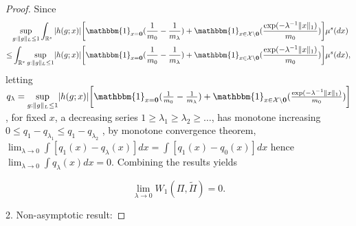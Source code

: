 \documentclass[10pt,fleqn]{article}
\newcommand{\be}{\begin{equation}\begin{aligned}}
\newcommand{\ee}{\end{aligned}\end{equation}}
\newcommand{\mc}[1]{\mathcal{#1}}
\DeclareMathOperator{\1}{\mathbbm{1}}
\begin{document}
\begin{proof}[Proof]
Since 
\be
&\underset{g:\|g\|_L\le 1}\sup\int_{\mathbb{R}^{s}}  |h(g; x)| 
 \bigg[ \mathbbm{1}_{x=\bf 0}(\frac{1}{m_0}-\frac{1}{m_\lambda})
 + \mathbbm{1}_{x \in \mc X \setminus\bf 0}(\frac{ \exp(- \lambda^{-1} \|x\|_1) }{m_0})
\bigg]\mu^{s}(d x) \\
\le & \int_{\mathbb{R}^{s}} \underset{g:\|g\|_L\le 1}\sup |h(g; x)| 
 \bigg[ \mathbbm{1}_{x=\bf 0}(\frac{1}{m_0}-\frac{1}{m_\lambda})
 + \mathbbm{1}_{x \in \mc X \setminus\bf 0}(\frac{ \exp(- \lambda^{-1} \|x\|_1) }{m_0})
\bigg]\mu^{s}(d x),
\ee
letting $q_\lambda=  \underset{g:\|g\|_L\le 1} \sup |h(g; x)| 
 \bigg[ \mathbbm{1}_{x=\bf 0}(\frac{1}{m_0}-\frac{1}{m_\lambda})
 + \mathbbm{1}_{x \in \mc X \setminus\bf 0}(\frac{ \exp(- \lambda^{-1} \|x\|_1) }{m_0})
\bigg]$, for fixed $x$, a decreasing series $1\ge\lambda_1\ge \lambda_2\ge \ldots$, has monotone increasing $0\le q_1-q_{\lambda_1}\le q_1-q_{\lambda_2}$ , by monotone convergence theorem, $\lim_{\lambda\to 0}\int [ q_1(x)-q_\lambda(x)]dx = \int [q_1(x)- q_0(x) ]dx$ hence $\lim_{\lambda\to 0}\int q_\lambda(x)dx =0$. Combining the results yields 



\begin{equation}
\underset{\lambda \to 0}\lim W_1(\Pi,\tilde\Pi)=0.        \end{equation}

2. Non-asymptotic result:



\end{proof}
\end{document}
